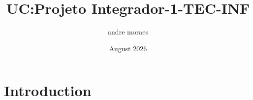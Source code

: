 \documentclass{article}
\title{UC:Projeto Integrador-1-TEC-INF}
\author{andre moraes}
\date{August 2026}
\begin{document}
\maketitle

\section{Introduction}
\end{document}
